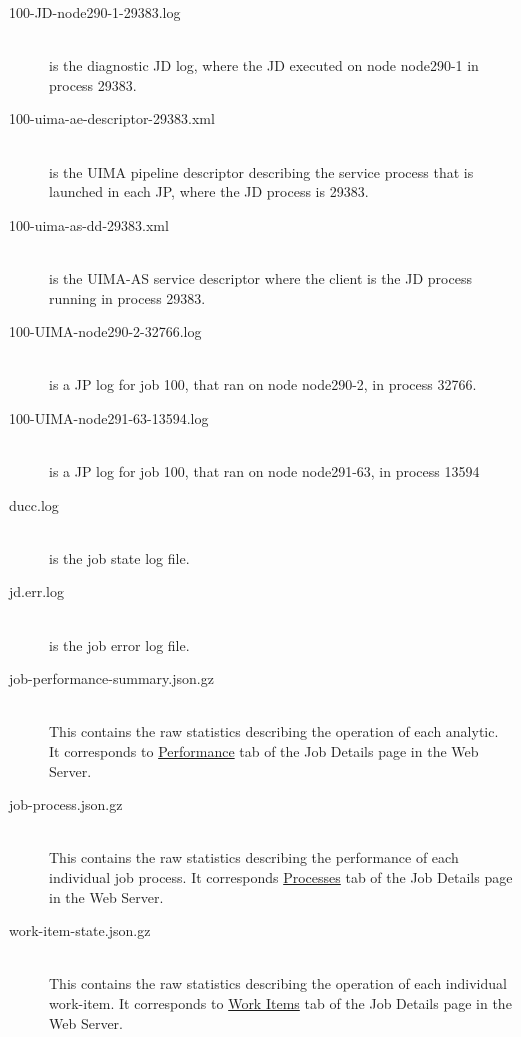 \begin{description}
     \item[100-JD-node290-1-29383.log]  \hfill \\
       is the diagnostic JD log, where the JD executed on node
       node290-1 in process 29383.

     \item[100-uima-ae-descriptor-29383.xml]  \hfill \\
       is the UIMA pipeline descriptor describing the
       service process that is launched in each JP, where the JD process is 29383.

     \item[100-uima-as-dd-29383.xml]  \hfill \\
       is the UIMA-AS service descriptor where the client is
       the JD process running in process 29383.

     \item[100-UIMA-node290-2-32766.log]  \hfill \\
       is a JP log for job 100, that ran on node
       node290-2, in process 32766.

     \item[100-UIMA-node291-63-13594.log]  \hfill \\
       is a JP log for job 100, that ran on node
       node291-63, in process 13594

     \item[ducc.log]  \hfill \\
       is the job state log file.

     \item[jd.err.log]  \hfill \\
       is the job error log file.

     \item[job-performance-summary.json.gz]  \hfill \\
       This contains the raw statistics describing
       the operation of each analytic.  It corresponds to \hyperref[subsec:performance]{Performance}
       tab of the Job Details page in the Web Server.

     \item[job-process.json.gz]  \hfill \\
       This contains the raw statistics describing
       the performance of each individual job process.  It corresponds \hyperref[subsec:ws-processes]{Processes}
       tab of the Job Details page in the Web Server.

     \item[work-item-state.json.gz]  \hfill \\
       This contains the raw statistics describing
       the operation of each individual work-item.  It corresponds to \hyperref[subsec:ws-work-items]{Work Items}
       tab of the Job Details page in the Web Server.
 \end{description}
     
